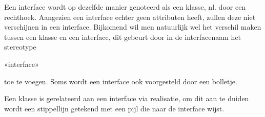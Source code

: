 Een interface wordt op dezelfde manier genoteerd als een klasse, nl. door een rechthoek. Aangezien een interface echter geen attributen heeft, zullen deze niet verschijnen in een interface.
Bijkomend wil men natuurlijk wel het verschil maken tussen een klasse en een interface, dit gebeurt door in de interfacenaam het stereotype

\begin{center}
«interface»
\end{center}

toe te voegen. Soms wordt een interface ook voorgesteld door een bolletje.

Een klasse is gerelateerd aan een interface via realisatie, om dit aan te duiden wordt een stippellijn getekend met een pijl die naar de interface wijst.

